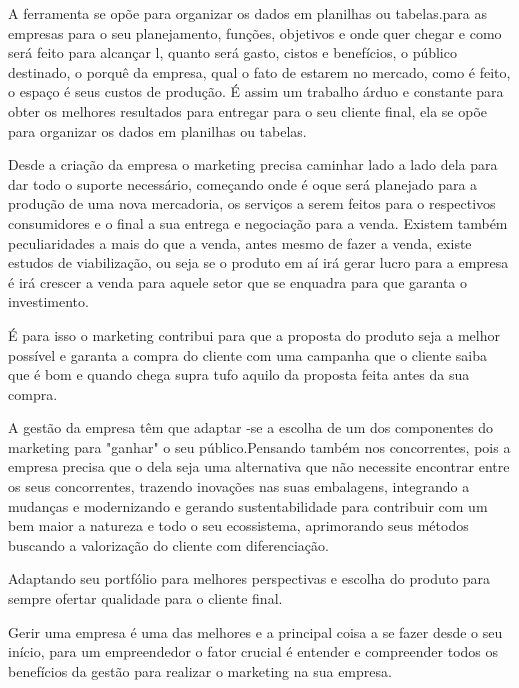 \documentclass[article, a4paper, 12pt, brazil]{abntex2}
\begin{document}
   \par A ferramenta se opõe para organizar os dados em planilhas ou tabelas.para as empresas para o seu planejamento, funções, objetivos e onde quer chegar e como será feito para alcançar l, quanto será gasto, cistos e benefícios, o público destinado, o porquê da empresa, qual o fato de estarem no mercado, como é feito, o espaço é seus custos de produção. É assim um trabalho árduo e constante para obter os melhores resultados para entregar para o seu cliente final, ela se opõe para organizar os dados em planilhas ou tabelas.\\
   \par Desde a criação da empresa o marketing precisa caminhar lado a lado dela para dar todo o suporte necessário, começando onde é oque será  planejado para a produção de uma nova mercadoria, os serviços a serem feitos para o respectivos consumidores e o final a sua entrega e negociação para a venda. Existem também peculiaridades a mais do que a venda, antes mesmo de fazer a venda, existe estudos de viabilização, ou seja se o produto em aí irá gerar lucro para a empresa é irá crescer a venda para aquele setor que se enquadra para que garanta o investimento.\\
   \par É para isso o marketing contribui para que a proposta do produto seja  a melhor possível e garanta a compra do cliente com uma campanha que o cliente saiba que é bom e quando chega supra tufo aquilo da proposta feita antes da sua compra.\\
   \par A gestão da empresa têm que adaptar -se a escolha de um dos componentes do marketing para "ganhar" o seu público.Pensando também nos concorrentes, pois a empresa precisa que o dela seja uma alternativa que não necessite encontrar entre os seus concorrentes, trazendo inovações nas suas embalagens, integrando a mudanças e modernizando e gerando sustentabilidade para contribuir com um bem maior a natureza e todo o seu ecossistema, aprimorando seus métodos buscando a valorização do cliente com diferenciação.\\
   \par Adaptando seu portfólio para melhores perspectivas e escolha do produto para sempre ofertar qualidade para o cliente final.\\
   \par Gerir uma empresa é uma das melhores e a principal coisa a se fazer desde o seu início, para um empreendedor o fator crucial é entender e compreender todos os benefícios da gestão para realizar o marketing na sua empresa.\\
\end{document}
